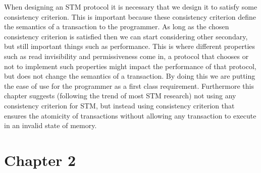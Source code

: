 \documentclass[runningheads,a4paper]{article}
\begin{document}
When designing an STM protocol it is necessary that we design it to satisfy
some consistency criterion.
This is important because these consistency criterion define the semantics
of a transaction to the programmer.
As long as the chosen consistency criterion is satisfied then we can start considering other
secondary, but still important things such as performance.
This is where different properties such as read invisibility and permissiveness
come in, a protocol that chooses or not to implement such properties might impact
the performance of that protocol, but does not change the semantics of a transaction.
By doing this we are putting the ease of use for the programmer as a first class requirement.
Furthermore this chapter suggests (following the trend of most STM research)
not using any consistency criterion for STM, but instead
using consistency criterion that ensures the atomicity
of transactions without allowing any transaction to execute in an invalid state of memory.










\section{Chapter 2}
\end{document}
